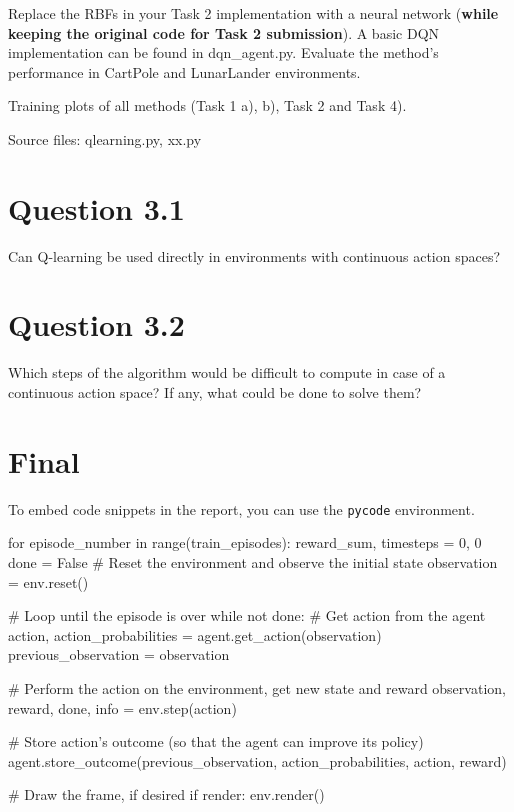\documentclass[12pt]{article}
\begin{document}
Replace the RBFs in your Task 2 implementation with a neural network
(\textbf{while keeping the original code for Task 2 submission}). A basic DQN implementation
can be found in dqn\_agent.py. Evaluate the method’s performance in CartPole and LunarLander
environments.
\newline

Training plots of all methods (Task 1 a), b), Task 2 and Task 4).
\newline

\noindent
Source files: qlearning.py, xx.py 

\section*{Question 3.1}

Can Q-learning be used directly in environments with continuous
action spaces?

\section*{Question 3.2}

Which steps of the algorithm would be difficult to compute in case of
a continuous action space? If any, what could be done to solve them?


\pagebreak

\section*{Final}

To embed code snippets in the report, you can use the \texttt{pycode} environment.

\begin{pycode}
for episode_number in range(train_episodes):
    reward_sum, timesteps = 0, 0
    done = False
    # Reset the environment and observe the initial state
    observation = env.reset()

    # Loop until the episode is over
    while not done:
        # Get action from the agent
        action, action_probabilities = agent.get_action(observation)
        previous_observation = observation

        # Perform the action on the environment, get new state and reward
        observation, reward, done, info = env.step(action)

        # Store action's outcome (so that the agent can improve its policy)
        agent.store_outcome(previous_observation, action_probabilities, action, reward)

        # Draw the frame, if desired
        if render:
            env.render()
\end{pycode}
\end{document}
